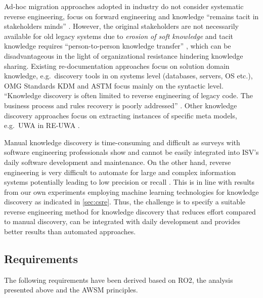 Ad-hoc migration approaches adopted in industry do not consider systematic reverse engineering, focus on forward engineering and knowledge ``remains tacit in stakeholders minds'' \autocite{Razavian2012}.
However, the original stakeholders are not necessarily available for old legacy systems due to \emph{erosion of soft knowledge} \autocite{Khadka2014ProfessionalsModernization} and tacit knowledge requires ``person-to-person knowledge transfer'' \autocite{Razavian2012}, which
can be disadvantageous in the light of organizational resistance \autocite{Khadka2014ProfessionalsModernization} hindering knowledge sharing.
Existing re-documentation approaches focus on solution domain knowledge, e.g.~discovery tools in \autocite{AmazonWebServices2018Migration} on systems level (databases,
servers, OS etc.), OMG Standards KDM and ASTM focus mainly on the syntactic level.
``Knowledge discovery is often limited to reverse engineering of legacy code.
The business process and rules recovery is poorly addressed'' \autocite{Mohagheghi2011REMICS}.
Other knowledge discovery approaches focus on extracting instances of specific meta models, e.g.~UWA in RE-UWA \autocite{Bernardi2009Re-UWA}.

Manual knowledge discovery is time-consuming and difficult as surveys with software engineering professionals show \autocite{Khadka2014ProfessionalsModernization,Batlajery2014IndustrialSurveyModernization} and cannot be easily integrated into ISV's daily software development and maintenance.
On the other hand, reverse engineering is very difficult to automate for large and complex information systems potentially leading to low precision or recall \autocite{Canfora2007ReverseEngineering}.
This is in line with results from our own experiments employing machine learning technologies for knowledge discovery as indicated in \cref{sec:csre}.
Thus, the challenge is to specify a suitable reverse engineering method for knowledge discovery that reduces effort compared to manual discovery, can be integrated with daily development and provides better results than automated approaches.

\hypertarget{sec:re.requirements}{%
\subsection{Requirements}\label{sec:re.requirements}}

The following requirements have been derived based on RO2, the analysis presented above and the AWSM principles.

